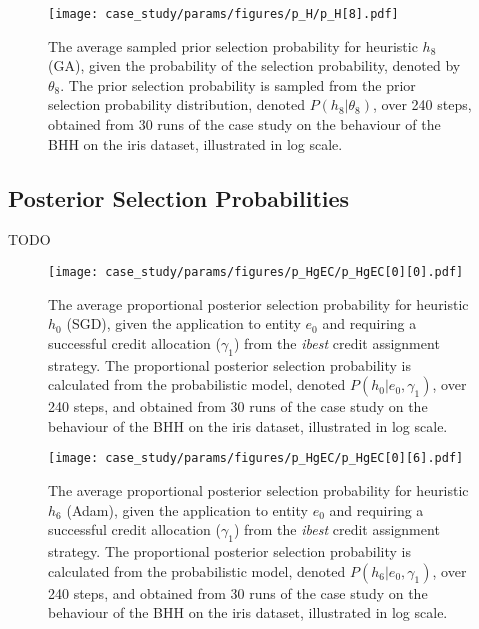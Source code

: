 \begin{figure}[htpb]
	\centering
	\texttt{[image: case\_study/params/figures/p\_H/p\_H[8].pdf]}
	\caption{The average sampled prior selection probability for heuristic $h_{8}$ (\acs{GA}), given the probability of the selection probability, denoted by $\theta_{8}$. The prior selection probability is sampled from the prior selection probability distribution, denoted $P(h_{8} \vert \theta_{8})$, over 240 steps, obtained from 30 runs of the case study on the behaviour of the \acs{BHH} on the iris dataset, illustrated in log scale.}
	\label{fig:results:case_study:p_H:8}
\end{figure}


\subsection{Posterior Selection Probabilities}\label{sec:results:case_study:posterior_selec_prob}

TODO

\begin{figure}[htpb]
	\centering
	\texttt{[image: case\_study/params/figures/p\_HgEC/p\_HgEC[0][0].pdf]}
	\caption{The average proportional posterior selection probability for heuristic $h_{0}$ (\acs{SGD}), given the application to entity $e_{0}$ and requiring a successful credit allocation ($\gamma_{1}$) from the \textit{ibest} credit assignment strategy. The proportional posterior selection probability is calculated from the probabilistic model, denoted $P(h_{0} \vert e_{0}, \gamma_{1})$, over 240 steps, and obtained from 30 runs of the case study on the behaviour of the \acs{BHH} on the iris dataset, illustrated in log scale.}
	\label{fig:results:case_study:p_HgEC:0:0}
\end{figure}


\begin{figure}[htpb]
	\centering
	\texttt{[image: case\_study/params/figures/p\_HgEC/p\_HgEC[0][6].pdf]}
	\caption{The average proportional posterior selection probability for heuristic $h_{6}$ (\acs{Adam}), given the application to entity $e_{0}$ and requiring a successful credit allocation ($\gamma_{1}$) from the \textit{ibest} credit assignment strategy. The proportional posterior selection probability is calculated from the probabilistic model, denoted $P(h_{6} \vert e_{0}, \gamma_{1})$, over 240 steps, and obtained from 30 runs of the case study on the behaviour of the \acs{BHH} on the iris dataset, illustrated in log scale.}
	\label{fig:results:case_study:p_HgEC:0:6}
\end{figure}

